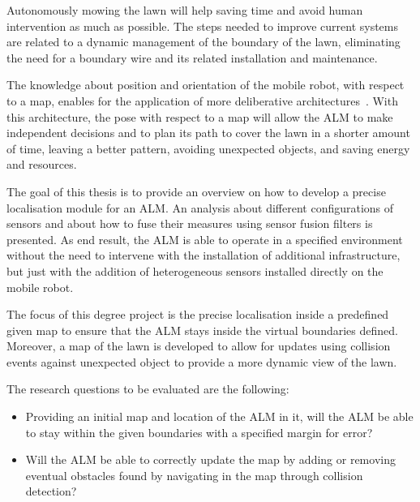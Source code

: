 \noindent Autonomously mowing the lawn will help saving time and avoid human intervention as much as possible.
The steps needed to improve current systems are related to a dynamic management of the boundary of the lawn, eliminating the need for a boundary wire and its related installation and maintenance.

The knowledge about position and orientation of the mobile robot, with respect to a map, enables for the application of more deliberative architectures~\cite{genesereth_logical_1987}.
With this architecture, the pose with respect to a map will allow the \gls{ALM} to make independent decisions and to plan its path to cover the lawn in a shorter amount of time, leaving a better pattern, avoiding unexpected objects, and saving energy and resources.

The goal of this thesis is to provide an overview on how to develop a precise localisation module for an \gls{ALM}.
An analysis about different configurations of sensors and about how to fuse their measures using sensor fusion filters is presented.
As end result, the \gls{ALM} is able to operate in a specified environment without the need to intervene with the installation of additional infrastructure, but just with the addition of heterogeneous sensors installed directly on the mobile robot.

The focus of this degree project is the precise localisation inside a predefined given map to ensure that the \gls{ALM} stays inside the virtual boundaries defined.
Moreover, a map of the lawn is developed to allow for updates using collision events against unexpected object to provide a more dynamic view of the lawn.

The research questions to be evaluated are the following:
\begin{itemize}
    \item Providing an initial map and location of the \gls{ALM} in it, will the \gls{ALM} be able to stay within the given boundaries with a specified margin for error?
    \item Will the \gls{ALM} be able to correctly update the map by adding or removing eventual obstacles found by navigating in the map through collision detection?
\end{itemize}

